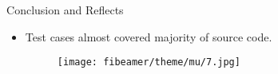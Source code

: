 \documentclass[final]{beamer}
\newlength{\sepwid}
\newlength{\onecolwid}
\newlength{\twocolwid}
\begin{document}
\begin{frame}
\begin{columns}[t]
\begin{column}{\twocolwid}
\begin{columns}[t,totalwidth=\twocolwid]
\begin{column}{\onecolwid}

\end{column} %
\begin{column}{\sepwid}\end{column} %

\begin{column}{\onecolwid} %



\end{column} %

\end{columns} %

\end{column} %

\begin{column}{\sepwid}\end{column} %

\begin{column}{\onecolwid} %




\begin{exampleblock}{Conclusion and Reflects}

                  \begin{itemize}
            
            \item Test cases almost covered majority of source code. 
       
  \begin{figure}
\texttt{[image: fibeamer/theme/mu/7.jpg]}
\end{figure}
       

\end{itemize}
\end{exampleblock}
\end{column}
\end{columns}
\end{frame}
\end{document}
